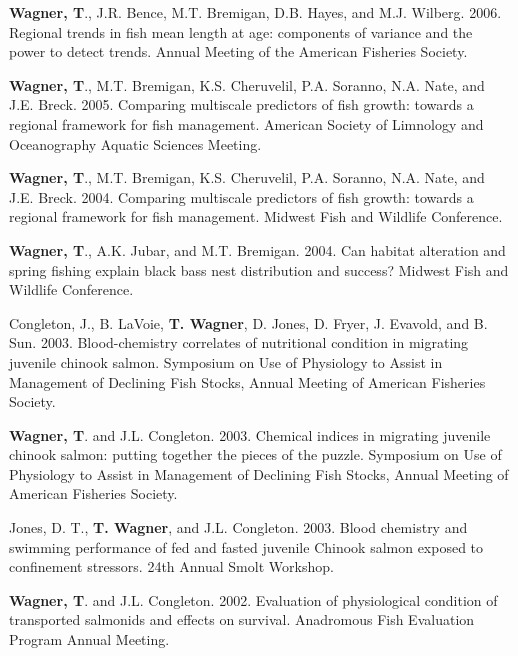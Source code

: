 \documentclass[10pt]{article}
\begin{document}
\begin{flushleft}
\begin{etaremune}
\item {\bf Wagner, T}., J.R. Bence, M.T. Bremigan, D.B. Hayes, and M.J. Wilberg. 2006. Regional trends in fish mean length at age: components of variance and the power to detect trends. Annual Meeting of the American Fisheries Society. 


\item {\bf Wagner, T}., M.T. Bremigan, K.S. Cheruvelil, P.A. Soranno, N.A. Nate, and J.E. Breck. 2005. Comparing multiscale predictors of fish growth: towards a regional framework for fish management. American Society of Limnology and Oceanography Aquatic Sciences Meeting. 


\item {\bf Wagner, T}., M.T. Bremigan, K.S. Cheruvelil, P.A. Soranno, N.A. Nate, and J.E. Breck. 2004. Comparing multiscale predictors of fish growth: towards a regional framework for fish management. Midwest Fish and Wildlife Conference.

\item {\bf Wagner, T}., A.K. Jubar, and M.T. Bremigan. 2004. Can habitat alteration and spring fishing explain black bass nest distribution and success? Midwest Fish and Wildlife Conference.


\item Congleton, J., B. LaVoie, {\bf T. Wagner}, D. Jones, D. Fryer, J. Evavold, and B. Sun. 2003. Blood-chemistry correlates of nutritional condition in migrating juvenile chinook salmon. Symposium on Use of Physiology to Assist in Management of Declining Fish Stocks, Annual Meeting of American Fisheries Society.

\item {\bf Wagner, T}. and J.L. Congleton. 2003. Chemical indices in migrating juvenile chinook salmon: putting together the pieces of the puzzle. Symposium on Use of Physiology to Assist in Management of Declining Fish Stocks, Annual Meeting of American Fisheries Society.

\item Jones, D. T., {\bf T. Wagner}, and J.L. Congleton. 2003. Blood chemistry and swimming performance of fed and fasted juvenile Chinook salmon exposed to confinement stressors. 24th Annual Smolt Workshop.


\item {\bf Wagner, T}. and J.L. Congleton. 2002. Evaluation of physiological condition of transported salmonids and effects on survival. Anadromous Fish Evaluation Program Annual Meeting.



\end{etaremune}
\end{flushleft}
\end{document}
